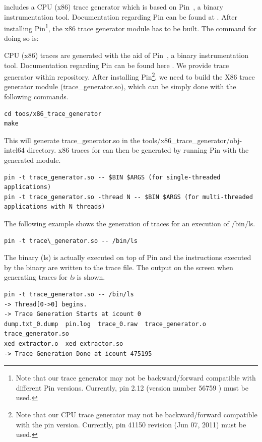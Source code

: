 \SIM includes a CPU (x86) trace generator which is based on Pin~\cite{pin}, a
binary instrumentation tool. Documentation regarding Pin can be found at
. After installing Pin\footnote{Note that our
trace generator may not be backward/forward compatible with different Pin
versions. Currently, pin 2.12 (version number 56759  )  must be used.}, the x86
trace generator module has to be built. The command for doing so is:


\ignore
		{
		CPU (x86) traces are generated with the aid of Pin~\cite{pin}, a
		binary instrumentation tool.  Documentation regarding Pin can be found 
		here .  We provide
		\cpu trace generator within \SIM repository. After installing
		Pin\footnote{Note that our CPU trace generator may not be
		  backward/forward compatible with the pin version. Currently, pin
		  41150 revision (Jun 07, 2011) must be used.}, we need to build the
		X86 trace generator module (trace\_generator.so), which can be simply
		done with the following commands.
		}



\begin{Verbatim}
cd toos/x86_trace_generator
make
\end{Verbatim}

\noindent This will generate trace\_generator.so in the
tools/x86\_trace\_generator/obj-intel64 directory. x86
traces for \SIM can then be generated by running Pin with the generated module.


\begin{Verbatim}
pin -t trace_generator.so -- $BIN $ARGS (for single-threaded applications)
pin -t trace_generator.so -thread N -- $BIN $ARGS (for multi-threaded applications with N threads)
\end{Verbatim}


The following example shows the generation of traces for an execution of /bin/ls. 

\begin{Verbatim}
pin -t trace\_generator.so -- /bin/ls
\end{Verbatim}


\noindent The binary (ls) is actually executed on top of Pin and the
instructions executed by the binary are written to the trace file. The output
on the screen when generating traces for \textit{ls} is shown.

\begin{Verbatim}
pin -t trace_generator.so -- /bin/ls
-> Thread[0->0] begins.
-> Trace Generation Starts at icount 0
dump.txt_0.dump  pin.log  trace_0.raw  trace_generator.o  trace_generator.so  
xed_extractor.o  xed_extractor.so
-> Trace Generation Done at icount 475195
\end{Verbatim}

